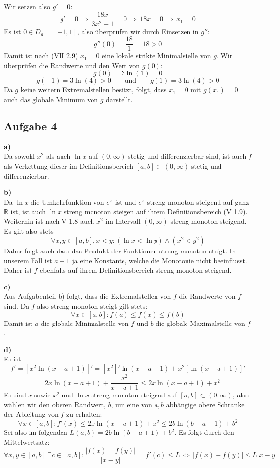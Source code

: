 \documentclass[a4paper,graphics,11pt]{article}
\newcommand{\aufgabe}[1]{\subsection*{Aufgabe #1}}
\begin{document}
Wir setzen also $g' = 0$:
$$
    g' = 0 \,\Longrightarrow\, \frac{18x}{3x^2+1} = 0
    \,\Longrightarrow\, 18x = 0 \,\Longrightarrow\, x_1 = 0
$$
Es ist $0 \in D_g = [-1, 1]$, also überprüfen wir durch Einsetzen in $g''$:
$$
    g''(0) = \frac{18}{1} = 18 > 0
$$
Damit ist nach (VII 2.9) $x_1=0$ eine lokale strikte Minimalstelle von $g$.
Wir überprüfen die Randwerte und den Wert von $g(0)$:
$$
    g(0) = 3\ln(1) = 0
$$$$
    g(-1) = 3\ln(4) > 0 \qquad\text{und}\qquad g(1) = 3\ln(4) >0
$$
Da $g$ keine weitern Extremalstellen besitzt, folgt, dass $x_1=0$ mit $g(x_1) = 0$ auch das
globale Minimum von $g$ darstellt.

\newpage
\aufgabe{4}
\textbf{a)}\\
Da sowohl $x^2$ als auch $\ln x$ auf $(0, \infty)$ stetig und differenzierbar sind, ist auch $f$ als Verkettung
dieser im Definitionsbereich $[a,b] \subset (0, \infty)$ stetig und differenzierbar.

\textbf{b)}\\
Da $\ln x$ die Umkehrfunktion von $e^x$ ist und $e^x$ streng monoton steigend auf ganz $\mathbb{R}$ ist,
ist auch $\ln x$ streng monoton steigen auf ihrem Definitionsbereich (V 1.9). Weiterhin ist nach V 1.8 auch
$x^2$ im Intervall $(0, \infty)$ streng monoton steigend.
Es gilt also stets
$$
    \forall x,y \in [a,b], x<y \colon (\ln x < \ln y) \land (x^2 < y^2)
$$
Daher folgt auch dass das Produkt der Funktionen streng monoton steigt. In unserem Fall ist $a+1$ ja eine Konstante,
welche die Monotonie nicht beeinflusst. Daher ist $f$ ebenfalls auf ihrem Definitionsbereich streng monoton steigend.

\textbf{c)}\\
Aus Aufgabenteil b) folgt, dass die Extremalstellen von $f$ die Randwerte von $f$ sind. Da $f$ also streng monoton
steigt gilt stets:
$$
    \forall x \in [a,b] \colon f(a) \leq f(x) \leq f(b)
$$
Damit ist $a$ die globale Minimalstelle von $f$ und $b$ die globale Maximalstelle von $f$.

\textbf{d)}\\
Es ist
$$
    f' = \left[x^2\ln(x-a+1)\right]'
    = [x^2]'\ln(x-a+1) + x^2[\ln(x-a+1)]'
$$$$
    = 2x\ln(x-a+1) + \frac{x^2}{x-a+1} \leq 2x\ln(x-a+1)+x^2
$$
Es sind $x$ sowie $x^2$ und $\ln x$ streng monoton steigend auf $[a,b] \subset (0, \infty)$,
also wählen wir den oberen Randwert, $b$, um eine von $a,b$ abhängige obere Schranke der Ableitung
von $f$ zu erhalten:
$$
    \forall x \in [a,b] \colon f'(x) \leq 2x\ln(x-a+1)+x^2 \leq 2b\ln(b-a+1)+b^2
$$
Sei also im folgenden $L(a,b) = 2b\ln(b-a+1)+b^2$. Es folgt durch den Mittelwertsatz:
$$
    \forall x,y \in [a,b]\ \exists c \in [a,b] \colon \frac{|f(x)-f(y)|}{|x-y|} = f'(c) \leq L
    \,\Longleftrightarrow\, |f(x)-f(y)| \leq L|x-y|
$$
\end{document}
